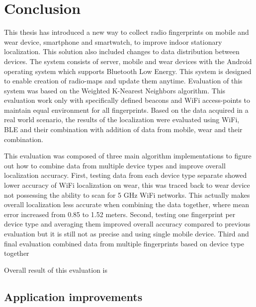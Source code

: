\chapter{Conclusion}\label{sec:Conclusion}
This thesis has introduced a new way to collect radio fingerprints on mobile and wear device, smartphone and smartwatch, to improve indoor stationary localization. This solution also included changes to data distribution between devices. The system consists of server, mobile and wear devices with the Android operating system which supports Bluetooth Low Energy. This system is designed to enable creation of radio-maps and update them anytime. Evaluation of this system was based on the Weighted K-Nearest Neighbors algorithm. This evaluation work only with specifically defined beacons and WiFi access-points to maintain equal environment for all fingerprints. Based on the data acquired in a real world scenario, the results of the localization were evaluated using WiFi, BLE and their combination with addition of data from mobile, wear and their combination.

This evaluation was composed of three main algorithm implementations to figure out how to combine data from multiple device types and improve overall localization accuracy. First, testing data from each device type separate showed lower accuracy of WiFi localization on wear, this was traced back to wear device not possessing the ability to scan for 5 GHz WiFi networks. This actually makes overall localization less accurate when combining the data together, where mean error increased from 0.85 to 1.52 meters. Second, testing one fingerprint per device type and averaging them improved overall accuracy compared to previous evaluation but it is still not as precise and using single mobile device. Third and final evaluation combined data from multiple fingerprints based on device type together %

Overall result of this evaluation is 

\section{Application improvements}
\label{sec:ApplicationImprovements}